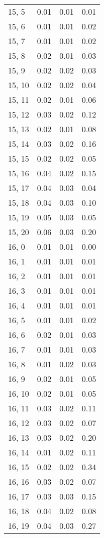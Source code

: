\begin{table}
\begin{tabular}{llll}
15, 5  &  0.01 &  0.01 &  0.01 \\
15, 6  &  0.01 &  0.01 &  0.02 \\
15, 7  &  0.01 &  0.01 &  0.02 \\
15, 8  &  0.02 &  0.01 &  0.03 \\
15, 9  &  0.02 &  0.02 &  0.03 \\
15, 10 &  0.02 &  0.02 &  0.04 \\
15, 11 &  0.02 &  0.01 &  0.06 \\
15, 12 &  0.03 &  0.02 &  0.12 \\
15, 13 &  0.02 &  0.01 &  0.08 \\
15, 14 &  0.03 &  0.02 &  0.16 \\
15, 15 &  0.02 &  0.02 &  0.05 \\
15, 16 &  0.04 &  0.02 &  0.15 \\
15, 17 &  0.04 &  0.03 &  0.04 \\
15, 18 &  0.04 &  0.03 &  0.10 \\
15, 19 &  0.05 &  0.03 &  0.05 \\
15, 20 &  0.06 &  0.03 &  0.20 \\
16, 0  &  0.01 &  0.01 &  0.00 \\
16, 1  &  0.01 &  0.01 &  0.01 \\
16, 2  &  0.01 &  0.01 &  0.01 \\
16, 3  &  0.01 &  0.01 &  0.01 \\
16, 4  &  0.01 &  0.01 &  0.01 \\
16, 5  &  0.01 &  0.01 &  0.02 \\
16, 6  &  0.02 &  0.01 &  0.03 \\
16, 7  &  0.01 &  0.01 &  0.03 \\
16, 8  &  0.01 &  0.02 &  0.03 \\
16, 9  &  0.02 &  0.01 &  0.05 \\
16, 10 &  0.02 &  0.01 &  0.05 \\
16, 11 &  0.03 &  0.02 &  0.11 \\
16, 12 &  0.03 &  0.02 &  0.07 \\
16, 13 &  0.03 &  0.02 &  0.20 \\
16, 14 &  0.01 &  0.02 &  0.11 \\
16, 15 &  0.02 &  0.02 &  0.34 \\
16, 16 &  0.03 &  0.02 &  0.07 \\
16, 17 &  0.03 &  0.03 &  0.15 \\
16, 18 &  0.04 &  0.02 &  0.08 \\
16, 19 &  0.04 &  0.03 &  0.27 \\

\end{tabular}
\end{table}
